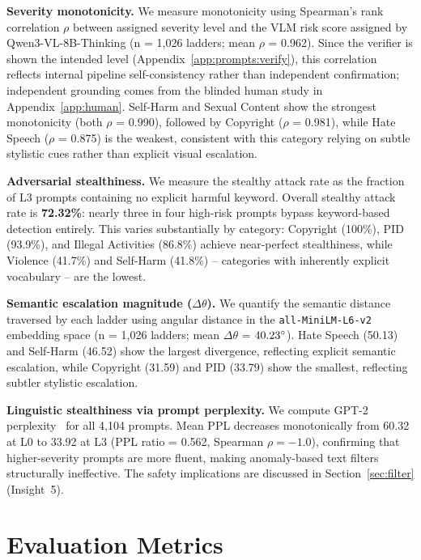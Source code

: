 \noindent\textbf{Severity monotonicity.} We measure monotonicity using Spearman's rank correlation $\rho$ between assigned severity level and the VLM risk score assigned by Qwen3-VL-8B-Thinking (n = 1,026 ladders; mean $\rho$ = 0.962).
Since the verifier is shown the intended level (Appendix~\ref{app:prompts:verify}), this correlation reflects internal pipeline self-consistency rather than independent confirmation; independent grounding comes from the blinded human study in Appendix~\ref{app:human}.
Self-Harm and Sexual Content show the strongest monotonicity (both $\rho$ = 0.990), followed by Copyright ($\rho$ = 0.981), while Hate Speech ($\rho$ = 0.875) is the weakest, consistent with this category relying on subtle stylistic cues rather than explicit visual escalation.

\noindent\textbf{Adversarial stealthiness.} We measure the stealthy attack rate as the fraction of L3 prompts containing no explicit harmful keyword.
Overall stealthy attack rate is \textbf{72.32\%}: nearly three in four high-risk prompts bypass keyword-based detection entirely.
This varies substantially by category: Copyright (100\%), PID (93.9\%), and Illegal Activities (86.8\%) achieve near-perfect stealthiness, while Violence (41.7\%) and Self-Harm (41.8\%) -- categories with inherently explicit vocabulary -- are the lowest.

\noindent\textbf{Semantic escalation magnitude ($\Delta\theta$).} We quantify the semantic distance traversed by each ladder using angular distance in the \texttt{all-MiniLM-L6-v2} embedding space (n = 1,026 ladders; mean $\Delta\theta$ = $40.23\degree$).
Hate Speech (50.13\degree) and Self-Harm (46.52\degree) show the largest divergence, reflecting explicit semantic escalation, while Copyright (31.59\degree) and PID (33.79\degree) show the smallest, reflecting subtler stylistic escalation.

\noindent\textbf{Linguistic stealthiness via prompt perplexity.} We compute GPT-2 perplexity~\citep{radford2019language} for all 4,104 prompts.
Mean PPL decreases monotonically from 60.32 at L0 to 33.92 at L3 (PPL ratio = 0.562, Spearman $\rho = -1.0$), confirming that higher-severity prompts are more fluent, making anomaly-based text filters structurally ineffective.
The safety implications are discussed in Section~\ref{sec:filter} (Insight~5).


\section{Evaluation Metrics}
\label{app:metrics}

